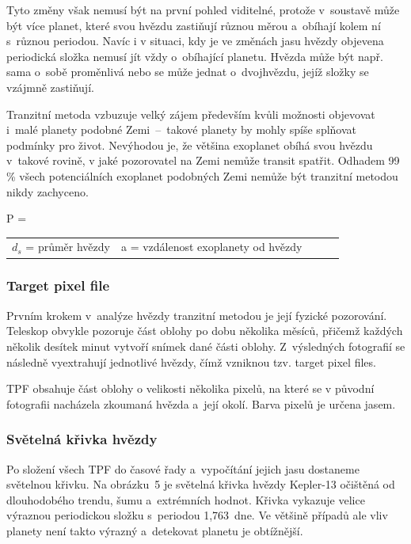 \documentclass[a4paper,12pt]{article}
\begin{document}
{
\drawgimp

Tyto změny však nemusí být na první pohled viditelné, protože v~soustavě může být více planet, které svou hvězdu zastiňují různou měrou a~obíhají kolem ní s~různou periodou. Navíc i v situaci, kdy je ve změnách jasu hvězdy objevena periodická složka nemusí jít vždy o~obíhající planetu. Hvězda může být např. sama o~sobě proměnlivá nebo se může jednat o~dvojhvězdu, jejíž složky se vzájmně zastiňují.~\cite{kepler80}

Tranzitní metoda vzbuzuje velký zájem především kvůli možnosti objevovat i~malé planety podobné Zemi~--~takové planety by mohly spíše splňovat podmínky pro život. Nevýhodou je, že většina exoplanet obíhá svou hvězdu v~takové rovině, v jaké pozorovatel na Zemi nemůže transit spatřit. Odhadem 99 \% všech potenciálních exoplanet podobných Zemi nemůže být tranzitní metodou nikdy zachyceno.~\cite{methods,transit}

 {P = }{
\begin{tabular}{llll}
	$d_s$ = průměr hvězdy & a = vzdálenost exoplanety od hvězdy \
\end{tabular}
}


\subsubsection{Target pixel file}

Prvním krokem v~analýze hvězdy tranzitní metodou je její fyzické pozorování. Teleskop obvykle pozoruje část oblohy po dobu několika měsíců, přičemž každých několik desítek minut vytvoří snímek dané části oblohy. Z~výsledných fotografií se následně vyextrahují jednotlivé hvězdy, čímž vzniknou tzv. target pixel files.

TPF obsahuje část oblohy o velikosti několika pixelů, na které se v původní fotografii nacházela zkoumaná hvězda a~její okolí. Barva pixelů je určena jasem.


\subsubsection{Světelná křivka hvězdy}

Po složení všech TPF do časové řady a~vypočítání jejich jasu dostaneme světelnou křivku. Na obrázku~5 je světelná křivka hvězdy Kepler-13 očištěná od dlouhodobého trendu, šumu a~extrémních hodnot. Křivka vykazuje velice výraznou periodickou složku s~periodou 1,763~dne. Ve většině případů ale vliv planety není takto výrazný a~detekovat planetu je obtížnější.

}
\end{document}
